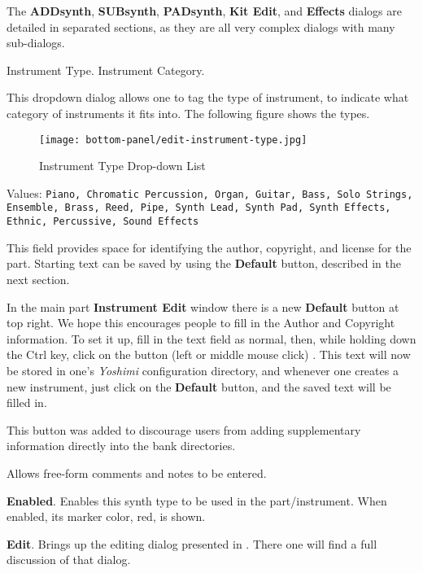    The \textbf{ADDsynth}, \textbf{SUBsynth}, \textbf{PADsynth},
   \textbf{Kit Edit}, and \textbf{Effects}
   dialogs are detailed in separated sections, as they are all
   very complex dialogs with many sub-dialogs.

   \setcounter{ItemCounter}{0}      %

   Instrument Type.
   Instrument Category.

   This dropdown dialog allows one to tag the type of instrument, to
   indicate what category of instruments it fits into.
   The following figure shows the types.

\begin{figure}[H]
   \centering
   \texttt{[image: bottom-panel/edit-instrument-type.jpg]}
   \caption{Instrument Type Drop-down List}
   \label{fig:instrument_type_dropdown}
\end{figure}

   Values: \texttt{Piano, Chromatic Percussion, Organ, Guitar, Bass,
              Solo Strings, Ensemble, Brass, Reed, Pipe,
              Synth Lead, Synth Pad, Synth Effects, Ethnic,
              Percussive, Sound Effects}

   This field provides space for identifying the author, copyright, and
   license for the part.  Starting text can be saved by using the
   \textbf{Default} button, described in the next section.

   In the main part \textbf{Instrument Edit} window there is a new
   \textbf{Default} button at top right.
   We hope this encourages people
   to fill in the Author and Copyright information.
   To set it up, fill in the text field as normal,
   then, while holding down the Ctrl key, click on the button
   (left or middle mouse click) . This text will now be stored in
   one's \textsl{Yoshimi} configuration directory,
   and whenever one creates a new instrument, just
   click on the \textbf{Default} button, and the saved text will be
   filled in.

   This button was added to discourage users from adding supplementary
   information directly into the bank directories.

   Allows free-form comments and notes to be entered.


   \begin{enumber}
      \item \textbf{Enabled}.
      Enables this synth type to be used in the part/instrument.
      When enabled, its marker color, red, is shown.
      \item \textbf{Edit}.
      Brings up the editing dialog presented in
      .
      There one will find a full discussion of that dialog.
   \end{enumber}

